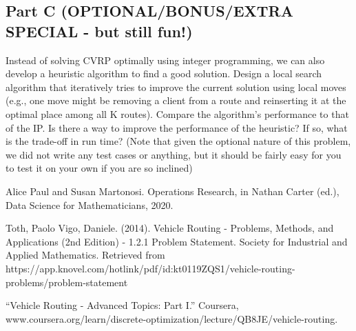 \documentclass{article}
\begin{document}
\subsection*{Part C (OPTIONAL/BONUS/EXTRA SPECIAL - but still fun!)}
Instead of solving CVRP optimally using integer programming, we can also develop a heuristic algorithm to find a good solution. Design a local search algorithm that iteratively tries to improve the current solution using local moves (e.g., one move might be removing a client from a route and reinserting it at the optimal place among all K routes). Compare the algorithm’s performance to that of the IP. Is there a way to improve the performance of the heuristic? If so, what is the trade-off in run time? (Note that given the optional nature of this problem, we did not write any test cases or anything, but it should be fairly easy for you to test it on your own if you are so inclined)

\begin{thebibliography}{9}
Alice Paul and Susan Martonosi. Operations Research, in Nathan Carter (ed.), Data Science for Mathematicians, 2020.

Toth, Paolo Vigo, Daniele. (2014). Vehicle Routing - Problems, Methods, and Applications (2nd Edition) - 1.2.1 Problem Statement. Society for Industrial and Applied Mathematics. Retrieved from
https://app.knovel.com/hotlink/pdf/id:kt0119ZQS1/vehicle-routing-problems/problem-statement

“Vehicle Routing - Advanced Topics: Part I.” Coursera, www.coursera.org/learn/discrete-optimization/lecture/QB8JE/vehicle-routing.

\end{thebibliography}
\end{document}
